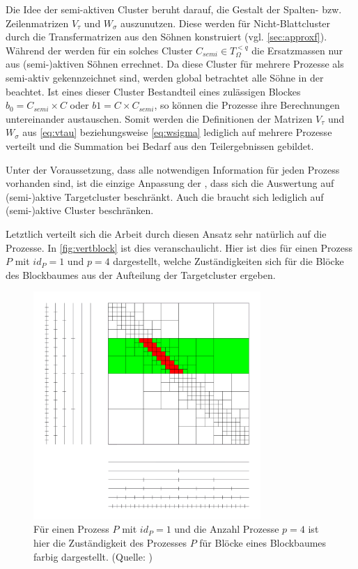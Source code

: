     Die Idee der semi-aktiven Cluster beruht darauf, die Gestalt der Spalten- bzw. Zeilenmatrizen $V_\tau$ und $W_\sigma$ auszunutzen. Diese werden für Nicht-Blattcluster durch die Transfermatrizen 
    aus den Söhnen konstruiert (vgl. \autoref{sec:approxf}). Während der \vorw werden für ein solches Cluster $C_{semi} \in T_\Omega^{<q}$ die Ersatzmassen nur aus (semi-)aktiven Söhnen
    errechnet. Da diese Cluster für mehrere Prozesse als semi-aktiv gekennzeichnet sind, werden global betrachtet alle Söhne in der \vorw beachtet. Ist eines dieser Cluster Bestandteil
    eines zulässigen Blockes $b_0 = C_{semi} \times C$ oder $b1 = C \times C_{semi}$, so können die Prozesse ihre Berechnungen untereinander austauschen. Somit werden die Definitionen der Matrizen
    $V_\tau$ und $W_\sigma$ aus \autoref{eq:vtau} beziehungsweise \autoref{eq:wsigma} lediglich auf mehrere Prozesse verteilt und die Summation bei Bedarf aus den Teilergebnissen gebildet.
    
    Unter der Voraussetzung, dass alle notwendigen Information für jeden Prozess vorhanden sind, ist die einzige Anpassung der \koppl, dass sich die Auswertung auf (semi-)aktive
    Targetcluster beschränkt. Auch die \ruckw braucht sich lediglich auf (semi-)aktive Cluster beschränken.
    
    Letztlich verteilt sich die Arbeit durch diesen Ansatz sehr natürlich auf die Prozesse. In \autoref{fig:vertblock} ist dies veranschaulicht. Hier ist dies für einen Prozess $P$ mit $id_P = 1$ 
    und $p = 4$ dargestellt, welche Zuständigkeiten sich für die Blöcke des Blockbaumes aus der Aufteilung der Targetcluster ergeben.
    
    \begin{figure}[b]
      \includegraphics[width=0.77\textwidth]{img/verteilter_blockbaum.png}
      \caption{Für einen Prozess $P$ mit $id_P = 1$ und die Anzahl Prozesse $p = 4$ ist hier die Zuständigkeit des Prozesses $P$ für Blöcke eines Blockbaumes farbig dargestellt.
	       (Quelle: \citet{h2slides})}
      \label{fig:vertblock}
    \end{figure}

